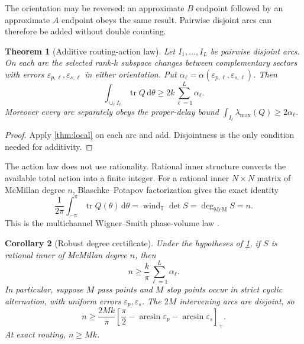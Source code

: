 \documentclass[11pt]{article}
\newtheorem{theorem}{Theorem}[section]
\newtheorem{corollary}[theorem]{Corollary}
\theoremstyle{definition}
\theoremstyle{remark}
\newcommand{\T}{\mathbb{T}}
\newcommand{\tr}{\operatorname{tr}}
\newcommand{\dd}{\mathrm{d}}
\newcommand{\mcdeg}{\deg_{\mathrm{McM}}}
\begin{document}
The orientation may be reversed: an approximate $B$ endpoint followed by an
approximate $A$ endpoint obeys the same result.  Pairwise disjoint arcs can
therefore be added without double counting.

\begin{theorem}[Additive routing-action law]\label{thm:additive}
Let $I_1,\ldots,I_L$ be pairwise disjoint arcs.  On each arc the selected
rank-$k$ subspace changes between complementary sectors with errors
$\varepsilon_{p,\ell},\varepsilon_{s,\ell}$ in either orientation.  Put
$\alpha_\ell=\alpha(\varepsilon_{p,\ell},\varepsilon_{s,\ell})$.  Then
\begin{equation}\label{eq:additive}
 \boxed{
 \int_{\cup_\ell I_\ell}\tr Q\,\dd\theta
 \geq2k\sum_{\ell=1}^L\alpha_\ell.}
\end{equation}
Moreover every arc separately obeys the proper-delay bound
$\int_{I_\ell}\lambda_{\max}(Q)\geq2\alpha_\ell$.
\end{theorem}

\begin{proof}
Apply \cref{thm:local} on each arc and add.  Disjointness is the only
condition needed for additivity.
\end{proof}

The action law does not use rationality.  Rational inner structure converts
the available total action into a finite integer.  For a rational inner
$N\times N$ matrix of McMillan degree $n$, Blaschke--Potapov factorization
gives the exact identity
\begin{equation}\label{eq:degreeidentity}
 \frac{1}{2\pi}\int_{-\pi}^{\pi}\tr Q(\theta)\,\dd\theta
 =\operatorname{wind}_{\T}\det S
 =\mcdeg S=n.
\end{equation}
This is the multichannel Wigner--Smith phase-volume law
\cite{McMillan1952,Wigner1955,Smith1960}.

\begin{corollary}[Robust degree certificate]\label{cor:degree}
Under the hypotheses of \cref{thm:additive}, if $S$ is rational inner of
McMillan degree $n$, then
\begin{equation}\label{eq:degreegeneral}
 \boxed{n\geq\frac{k}{\pi}\sum_{\ell=1}^L\alpha_\ell.}
\end{equation}
In particular, suppose $M$ pass points and $M$ stop points occur in strict
cyclic alternation, with uniform errors $\varepsilon_p,\varepsilon_s$.
The $2M$ intervening arcs are disjoint, so
\begin{equation}\label{eq:alternating}
 \boxed{
 n\geq\frac{2Mk}{\pi}
 \left[\frac{\pi}{2}-\arcsin\varepsilon_p
                       -\arcsin\varepsilon_s\right]_+.}
\end{equation}
At exact routing, $n\geq Mk$.
\end{corollary}
\end{document}
